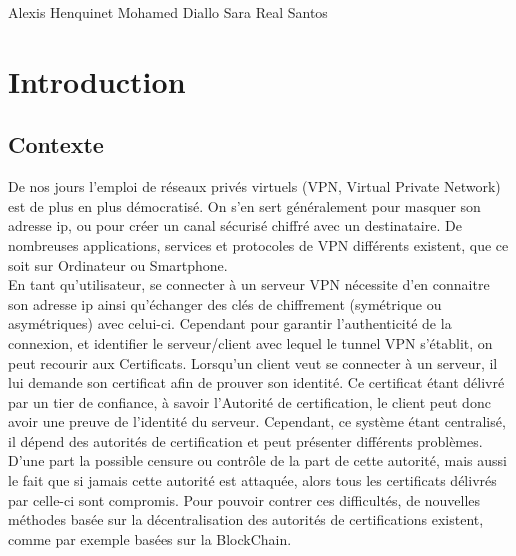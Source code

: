 \documentclass[12pt, openany]{report}
\begin{document}
\begin{titlepage}
\begin{sffamily}
\begin{center}
   \vfill
      \begin{center}
        \Large	 Alexis Henquinet \hspace*{1cm} Mohamed Diallo \hspace*{1cm} Sara Real Santos
      \end{center}
 
 
  \end{center}
  \end{sffamily}
\end{titlepage}

\newpage

\renewcommand{\contentsname}{Sommaire}
\tableofcontents
\newpage

\section{Introduction}
\subsection{Contexte}
\noindent 
\begin{flushleft}
De nos jours l'emploi de réseaux privés virtuels (VPN, Virtual Private Network) est de plus en plus démocratisé. On s'en sert généralement pour masquer son adresse ip, ou pour créer un canal sécurisé chiffré avec un destinataire. De nombreuses applications, services et protocoles de VPN différents existent, que ce soit sur Ordinateur ou Smartphone.\\
En tant qu'utilisateur, se connecter à un serveur VPN nécessite d'en connaitre son adresse ip ainsi qu'échanger des clés de chiffrement (symétrique ou asymétriques) avec celui-ci. Cependant pour garantir l'authenticité de la connexion, et identifier le serveur/client avec lequel le tunnel VPN s'établit, on peut recourir aux Certificats. Lorsqu'un client veut se connecter à un serveur, il lui demande son certificat afin de prouver son identité. Ce certificat étant délivré par un tier de confiance, à savoir l'Autorité de certification, le client peut donc avoir une preuve de l'identité du serveur. Cependant, ce système étant centralisé, il dépend des autorités de certification et peut présenter différents problèmes. D'une part la possible censure ou contrôle de la part de cette autorité, mais aussi le fait que si jamais cette autorité est attaquée, alors tous les certificats délivrés par celle-ci sont compromis. Pour pouvoir contrer ces difficultés, de nouvelles méthodes basée sur la décentralisation des autorités de certifications existent, comme par exemple basées sur la BlockChain.\\
\end{flushleft}
\end{document}
